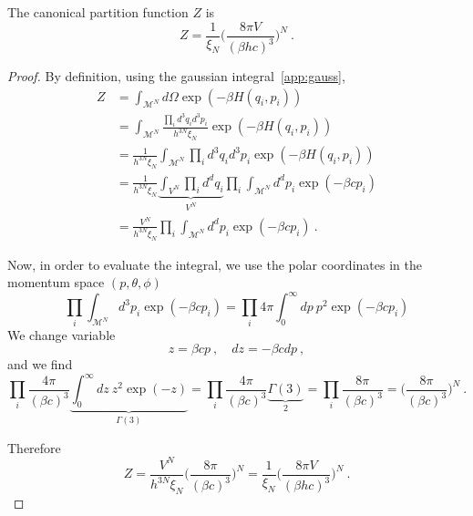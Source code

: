     The canonical partition function $Z$ is 
    \begin{equation*}
        Z = \frac{1}{\xi_N} \Big (\frac{8\pi V}{(\beta h c)^3} \Big )^N ~.
    \end{equation*}
    \begin{proof}
        By definition, using the gaussian integral~\eqref{app:gauss},
        \begin{equation*}
        \begin{aligned}
            Z & = \int_{\mathcal M^N} d\Omega \exp(- \beta H (q_i, p_i)) \\ & = \int_{\mathcal M^N} \frac{\prod_i d^3 q_i d^3 p_i}{h^{3N} \xi_N} \exp(- \beta H (q_i, p_i)) \\ & = \frac{1}{h^{3N} \xi_N} \int_{\mathcal M^N} \prod_i d^3 q_i d^3 p_i \exp(- \beta H (q_i, p_i)) \\ & = \frac{1}{h^{3N} \xi_N} \underbrace{\int_{ V^N} \prod_i d^d q_i}_{V^N} \prod_i \int_{\mathcal M^N} d^d p_i \exp(- \beta c p_i) \\ & = \frac{V^N}{h^{3N} \xi_N} \prod_i \int_{\mathcal M^N} d^d p_i \exp(- \beta c p_i) ~.
        \end{aligned}
        \end{equation*}

        Now, in order to evaluate the integral, we use the polar coordinates in the momentum space $(p, \theta, \phi)$
        \begin{equation*}
            \prod_i \int_{\mathcal M^N} d^3 p_i \exp(- \beta c p_i) = \prod_i 4 \pi \int_0^\infty dp ~ p^2 \exp(- \beta c p_i)
        \end{equation*}
        We change variable 
        \begin{equation*}
            z = \beta c p ~, \quad dz = - \beta c dp ~,
        \end{equation*}
        and we find 
        \begin{equation*}
            \prod_i \frac{4\pi}{(\beta c)^3} \underbrace{\int_0^\infty dz ~ z^2 \exp(- z)}_{\Gamma (3)} = \prod_i \frac{4\pi}{(\beta c)^3} \underbrace{\Gamma (3)}_2 = \prod_i \frac{8\pi}{(\beta c)^3} = \Big (\frac{8\pi}{(\beta c)^3} \Big )^N ~.
        \end{equation*}

        Therefore 
        \begin{equation*}
            Z = \frac{V^N}{h^{3N} \xi_N} \Big (\frac{8\pi}{(\beta c)^3} \Big )^N = \frac{1}{\xi_N} \Big (\frac{8\pi V}{(\beta h c)^3} \Big )^N ~.
        \end{equation*}
    \end{proof}


